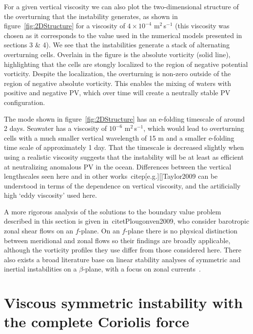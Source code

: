For a given vertical viscosity we can also plot the two-dimensional structure of the overturning that the instability generates, as shown in figure~\ref{fig:2DStructure} for a viscosity of $4 \times 10 ^{-4}$ m$^2$\,s$^{-1}$ (this viscosity was chosen as it corresponds to the value used in the numerical models presented in sections 3 \& 4). We see that the instabilities generate a stack of alternating overturning cells. Overlain in the figure is the absolute vorticity (solid line), highlighting that the cells are stongly localized to the region of negative potential vorticity. Despite the localization, the overturning is non-zero outside of the region of negative absolute vorticity. This enables the mixing of waters with positive and negative PV, which over time will create a neutrally stable PV configuration.

The mode shown in figure~\ref{fig:2DStructure} has an e-folding timescale of around 2 days. Seawater has a viscosity of $10^{-6}$ m$^{2}$\,s$^{-1}$, which would lead to overturning cells with a much smaller vertical wavelength of 15 m and a smaller e-folding time scale of approximately 1 day. That the timescale is decreased slightly when using a realistic viscosity suggests that the instability will be at least as efficient at neutralizing anomalous PV in the ocean. Differences between the vertical lengthscales seen here and in other works~citep[e.g.][]{Taylor2009} can be understood in terms of the dependence on vertical viscosity, and the artificially high ‘eddy viscosity’ used here.

A more rigorous analysis of the solutions to the boundary value problem described in this section is given in~citet{Plougonven2009}, who consider barotropic zonal shear flows on an $f$-plane. On an $f$-plane there is no physical distinction between meridional and zonal flows so their findings are broadly applicable, although the vorticity profiles they use differ from those considered here. There also exists a broad literature base on linear stability analyses of symmetric and inertial instabilities on a $\beta$-plane, with a focus on zonal currents~\citep[e.g.][]{Kloosterziel2017, Ribstein2014,Griffiths2003, Hua1997}.

\section{Viscous symmetric instability with the complete Coriolis force}

